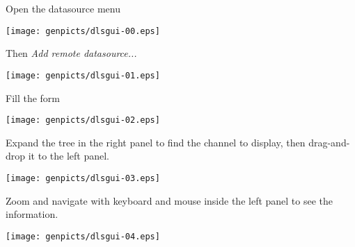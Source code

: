 \noindent Open the datasource menu
\begin{center}
\texttt{[image: genpicts/dlsgui-00.eps]}
\end{center}

\noindent Then \textit{Add remote datasource...}
\begin{center}
\texttt{[image: genpicts/dlsgui-01.eps]}
\end{center}

\noindent Fill the form
\begin{center}
\texttt{[image: genpicts/dlsgui-02.eps]}
\end{center}


\noindent Expand the tree in the right panel to find
the channel to display, then drag-and-drop it to the left panel.
\begin{center}
\texttt{[image: genpicts/dlsgui-03.eps]}
\end{center}

\noindent Zoom and navigate with keyboard and mouse inside the left panel
to see the information.
\begin{center}
\texttt{[image: genpicts/dlsgui-04.eps]}
\end{center}
